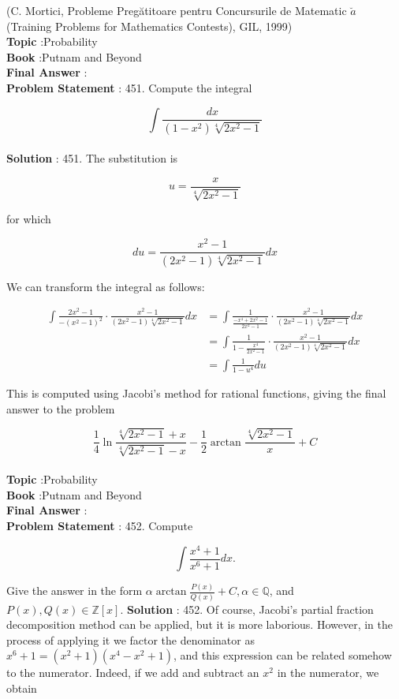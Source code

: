 \documentclass[10pt]{article}
\begin{document}
(C. Mortici, Probleme Pregătitoare pentru Concursurile de Matematic $\breve{a}$ (Training Problems for Mathematics Contests), GIL, 1999)
\\
\textbf{Topic} :Probability\\
\textbf{Book} :Putnam and Beyond\\
\textbf{Final Answer} :\\


\textbf{Problem Statement} :
451. Compute the integral

$$
\int \frac{d x}{\left(1-x^{2}\right) \sqrt[4]{2 x^{2}-1}}
$$
\\
\textbf{Solution} :
451. The substitution is

$$
u=\frac{x}{\sqrt[4]{2 x^{2}-1}}
$$

for which

$$
d u=\frac{x^{2}-1}{\left(2 x^{2}-1\right) \sqrt[4]{2 x^{2}-1}} d x
$$

We can transform the integral as follows:

$$
\begin{aligned}
\int \frac{2 x^{2}-1}{-\left(x^{2}-1\right)^{2}} \cdot \frac{x^{2}-1}{\left(2 x^{2}-1\right) \sqrt[4]{2 x^{2}-1}} d x &=\int \frac{1}{\frac{-x^{4}+2 x^{2}-1}{2 x^{2}-1}} \cdot \frac{x^{2}-1}{\left(2 x^{2}-1\right) \sqrt[4]{2 x^{2}-1}} d x \\
&=\int \frac{1}{1-\frac{x^{4}}{2 x^{2}-1}} \cdot \frac{x^{2}-1}{\left(2 x^{2}-1\right) \sqrt[4]{2 x^{2}-1}} d x \\
&=\int \frac{1}{1-u^{4}} d u
\end{aligned}
$$

This is computed using Jacobi's method for rational functions, giving the final answer to the problem

$$
\frac{1}{4} \ln \frac{\sqrt[4]{2 x^{2}-1}+x}{\sqrt[4]{2 x^{2}-1}-x}-\frac{1}{2} \arctan \frac{\sqrt[4]{2 x^{2}-1}}{x}+C
$$
\\
\textbf{Topic} :Probability\\
\textbf{Book} :Putnam and Beyond\\
\textbf{Final Answer} :\\


\textbf{Problem Statement} :
452. Compute

$$
\int \frac{x^{4}+1}{x^{6}+1} d x .
$$

Give the answer in the form $\alpha \arctan \frac{P(x)}{Q(x)}+C, \alpha \in \mathbb{Q}$, and $P(x), Q(x) \in \mathbb{Z}[x]$. 
\textbf{Solution} :
452. Of course, Jacobi's partial fraction decomposition method can be applied, but it is more laborious. However, in the process of applying it we factor the denominator as $x^{6}+1=\left(x^{2}+1\right)\left(x^{4}-x^{2}+1\right)$, and this expression can be related somehow to the numerator. Indeed, if we add and subtract an $x^{2}$ in the numerator, we obtain
\end{document}
